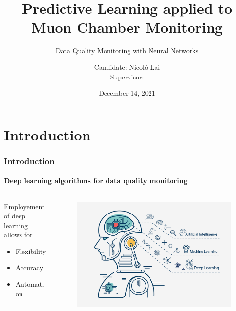 \documentclass{beamer}
\title{Predictive Learning applied to \\ Muon Chamber Monitoring}
\subtitle{Data Quality Monitoring with Neural Networks}
\author{\texorpdfstring{Candidate: Nicolò Lai \\\vspace{1ex} Supervisor: \supervisor \vspace{3ex}}{}}
\date{December 14, 2021}
\begin{document}
	\maketitle

	\section{Introduction}
	\begin{frame}
		\frametitle{Introduction}
		\framesubtitle{Deep learning algorithms for data quality monitoring}
		
		\begin{columns}
			\begin{column}{0.5\textwidth}
				Employement of \alert{deep learning} allows for
				\vspace{1em}
				\begin{itemize}
					\setlength{\itemsep}{0.6em}
					\item Flexibility
					\item Accuracy
					\item Automation
				\end{itemize}
			\end{column}
			\begin{column}{0.5\textwidth}
				\begin{figure}
					\centering 
					\includegraphics[width=1.0\textwidth]{./Images/deep_learning.jpg}
				\end{figure}
			\end{column}
		\end{columns}

	\end{frame}
\end{document}

